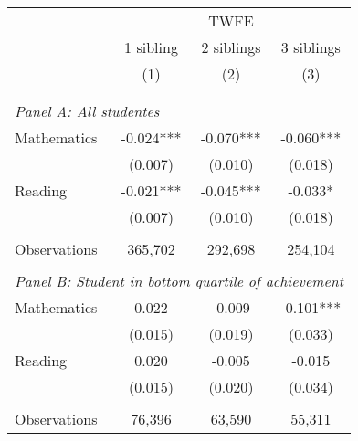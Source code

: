 \makeatletter
{}
{
\makeatother
\begin{tabular}{lccc}
\toprule
\cmidrule(lr){2-4}
& \multicolumn{3}{c}{TWFE} \\
\cmidrule(lr){2-4}
& 1 sibling & 2 siblings & 3 siblings  \\
\cmidrule(lr){2-2} \cmidrule(lr){3-3} \cmidrule(lr){4-4}
& (1) & (2) & (3)\\
\bottomrule
&  &  &  \\
&  &  &   \\
\multicolumn{4}{l}{\textit{Panel A: All studentes}} \\
\hspace{3mm}Mathematics&      -0.024***&      -0.070***&      -0.060***\\
                    &     (0.007)   &     (0.010)   &     (0.018)   \\
 
\hspace{3mm}Reading &      -0.021***&      -0.045***&      -0.033*  \\
                    &     (0.007)   &     (0.010)   &     (0.018)   \\
                    &               &               &               \\
\hspace{3mm}Observations&     365,702   &     292,698   &     254,104   \\
 
&  &  &   \\
\multicolumn{4}{l}{\textit{Panel B: Student in bottom quartile of achievement}} \\
\hspace{3mm}Mathematics&       0.022   &      -0.009   &      -0.101***\\
                    &     (0.015)   &     (0.019)   &     (0.033)   \\
 
\hspace{3mm}Reading &       0.020   &      -0.005   &      -0.015   \\
                    &     (0.015)   &     (0.020)   &     (0.034)   \\
                    &               &               &               \\
\hspace{3mm}Observations&      76,396   &      63,590   &      55,311   \\
 

\end{tabular}}
